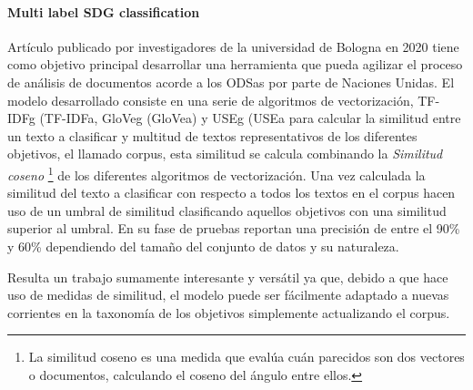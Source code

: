 \paragraph{Multi label SDG classification}Artículo publicado por investigadores de
la universidad de Bologna en 2020 tiene como objetivo principal desarrollar una
herramienta que pueda agilizar el proceso de análisis de documentos acorde a los
\gls{ODSa}s por parte de Naciones Unidas. El modelo desarrollado consiste en una serie
de algoritmos de vectorización, \gls{TF-IDFg}  (\gls{TF-IDFa}, \gls{GloVeg} (\gls{GloVea})  y \gls{USEg} (\gls{USEa}  para calcular la similitud
entre un texto a clasificar y multitud de textos representativos de los
diferentes objetivos, el llamado corpus, esta similitud se calcula combinando la
\textit{Similitud coseno} \footnote{La similitud coseno es una medida que evalúa cuán parecidos son dos vectores o documentos, calculando el coseno del ángulo entre ellos.} de los diferentes algoritmos de
vectorización. Una vez calculada la similitud del texto a clasificar con
respecto a todos los textos en el corpus hacen uso de un umbral de similitud
clasificando aquellos objetivos con una similitud superior al umbral. En su fase
de pruebas reportan una precisión de entre el 90\% y 60\% dependiendo del tamaño
del conjunto de datos y su naturaleza. \cite{DBLP:journals/corr/abs-2004-03455}

Resulta un trabajo sumamente interesante y versátil ya que, debido a que hace
uso de medidas de similitud, el modelo puede ser fácilmente adaptado a nuevas
corrientes en la taxonomía de los objetivos simplemente actualizando el corpus.
